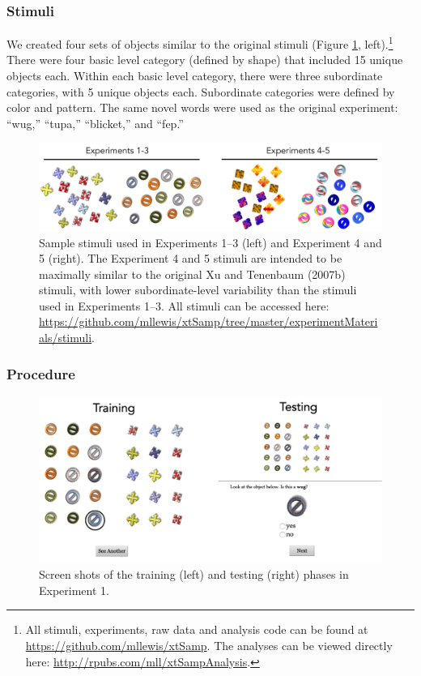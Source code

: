 \documentclass[man]{apa2}
\begin{document}
\subsubsection{Stimuli}
We created four sets of objects similar to the original stimuli (Figure \ref{fig:stims}, left).\footnote{All stimuli, experiments, raw data and analysis code can be found at \url{https://github.com/mllewis/xtSamp}. The analyses can be viewed directly here: \url{http://rpubs.com/mll/xtSampAnalysis}.} There were four basic level category (defined by shape) that included 15 unique objects each. Within each basic level category, there were three subordinate categories, with 5 unique objects each. Subordinate categories were defined by color and pattern. The same novel words were used as the original experiment: ``wug,'' ``tupa,'' ``blicket,'' and ``fep.''
\begin{figure}[t]
 \begin{center} 
 \includegraphics[width=5in]{figures/stims.png} 
 \caption{ \label{fig:stims} Sample stimuli used in Experiments 1--3 (left) and Experiment 4 and 5 (right). The Experiment 4 and 5 stimuli are intended to be maximally similar to the original Xu and Tenenbaum (2007b) stimuli, with lower subordinate-level variability than the stimuli used in Experiments 1--3. All stimuli can be accessed here: \url{https://github.com/mllewis/xtSamp/tree/master/experimentMaterials/stimuli}. } 
 \end{center} 
\end{figure}	
 
\subsubsection{Procedure}
 \begin{figure} [t]
 \begin{center} 
 \includegraphics[width=5.5in]{figures/screen.png} 
 \caption{\label{fig:screen} Screen shots of the training (left) and testing (right) phases in Experiment 1. } 
 \end{center} 
\end{figure}
\end{document}
